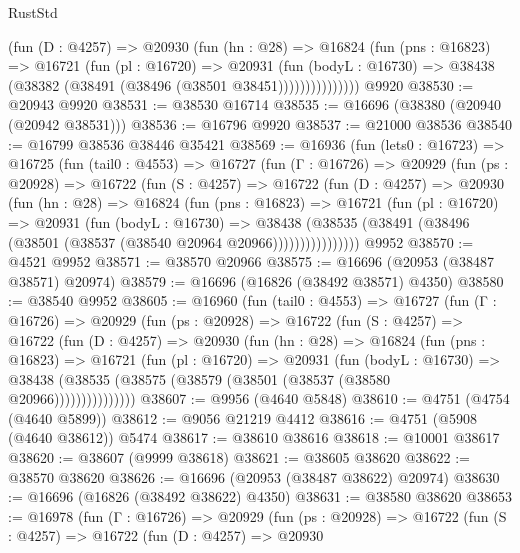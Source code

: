 \begin{lexlean}{RustStd}
\begin{coremodule}
                (fun (D : @4257) =>
                @20930
                  (fun (hn : @28) =>
                  @16824
                    (fun (pns : @16823) =>
                    @16721
                      (fun (pl : @16720) =>
                      @20931
                        (fun (bodyL : @16730) =>
                        @38438 (@38382 (@38491 (@38496 (@38501 @38451)))))))))))))))
    @9920
@38530 := @20943 @9920
@38531 := @38530 @16714
@38535 := @16696 (@38380 (@20940 (@20942 @38531)))
@38536 := @16796 @9920
@38537 := @21000 @38536
@38540 := @16799 @38536 @38446 @35421
@38569 := @16936
    (fun (lets0 : @16723) =>
    @16725
      (fun (tail0 : @4553) =>
      @16727
        (fun (Γ : @16726) =>
        @20929
          (fun (ps : @20928) =>
          @16722
            (fun (S : @4257) =>
            @16722
              (fun (D : @4257) =>
              @20930
                (fun (hn : @28) =>
                @16824
                  (fun (pns : @16823) =>
                  @16721
                    (fun (pl : @16720) =>
                    @20931
                      (fun (bodyL : @16730) =>
                      @38438
                        (@38535
                          (@38491 (@38496 (@38501 (@38537 (@38540 @20964 @20966))))))))))))))))
    @9952
@38570 := @4521 @9952
@38571 := @38570 @20966
@38575 := @16696 (@20953 (@38487 @38571) @20974)
@38579 := @16696 (@16826 (@38492 @38571) @4350)
@38580 := @38540 @9952
@38605 := @16960
    (fun (tail0 : @4553) =>
    @16727
      (fun (Γ : @16726) =>
      @20929
        (fun (ps : @20928) =>
        @16722
          (fun (S : @4257) =>
          @16722
            (fun (D : @4257) =>
            @20930
              (fun (hn : @28) =>
              @16824
                (fun (pns : @16823) =>
                @16721
                  (fun (pl : @16720) =>
                  @20931
                    (fun (bodyL : @16730) =>
                    @38438 (@38535 (@38575 (@38579 (@38501 (@38537 (@38580 @20966)))))))))))))))
@38607 := @9956 (@4640 @5848)
@38610 := @4751 (@4754 (@4640 @5899))
@38612 := @9056 @21219 @4412
@38616 := @4751 (@5908 (@4640 @38612)) @5474
@38617 := @38610 @38616
@38618 := @10001 @38617
@38620 := @38607 (@9999 @38618)
@38621 := @38605 @38620
@38622 := @38570 @38620
@38626 := @16696 (@20953 (@38487 @38622) @20974)
@38630 := @16696 (@16826 (@38492 @38622) @4350)
@38631 := @38580 @38620
@38653 := @16978
    (fun (Γ : @16726) =>
    @20929
      (fun (ps : @20928) =>
      @16722
        (fun (S : @4257) =>
        @16722
          (fun (D : @4257) =>
          @20930

\end{coremodule}
\end{lexlean}
